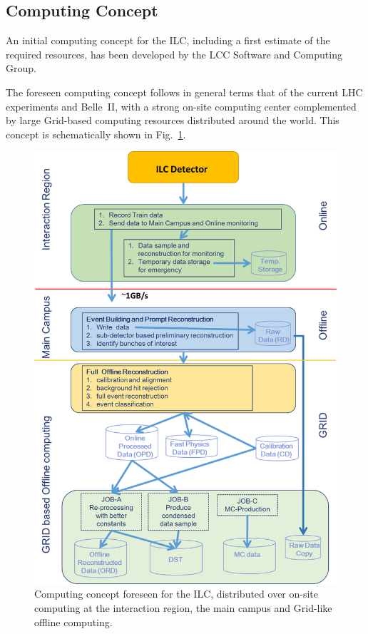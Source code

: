 
\subsection{\label{sub:sw-computing}Computing Concept}


An initial computing concept for the ILC, including a first estimate of the required resources, has been developed by the LCC Software and Computing Group.

The foreseen computing concept follows in general terms that of the current LHC experiments and Belle~II, with a strong on-site computing
center complemented by large Grid-based computing resources distributed around the world. This concept is schematically shown in
Fig.~\ref{fig:computing_scheme}.

\begin{figure}
\begin{center}
\includegraphics[width=0.6\hsize]{chapters/figures/ILC_computing_scheme.png}
\end{center}
\caption{Computing concept foreseen for the ILC, distributed over on-site computing at the interaction region, the main campus and Grid-like
  offline computing.}
\label{fig:computing_scheme}
\end{figure}

